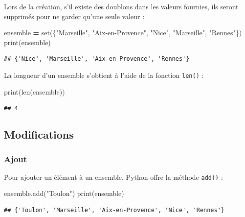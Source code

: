 \documentclass[12pt,]{book}
\newenvironment{Shaded}{\begin{snugshade}}{\end{snugshade}}
\newcommand{\StringTok}[1]{\textcolor[rgb]{0.31,0.60,0.02}{#1}}
\newcommand{\OperatorTok}[1]{\textcolor[rgb]{0.81,0.36,0.00}{\textbf{#1}}}
\newcommand{\BuiltInTok}[1]{#1}
\newcommand{\NormalTok}[1]{#1}
\numberwithin{equation}{section}
\numberwithin{countremarque}{section}
\begin{document}
Lors de la création, s'il existe des doublons dans les valeurs fournies,
ils seront supprimés pour ne garder qu'une seule valeur :

\begin{Shaded}
\begin{Highlighting}[]
\NormalTok{ensemble }\OperatorTok{=} \BuiltInTok{set}\NormalTok{(\{}\StringTok{"Marseille"}\NormalTok{, }\StringTok{"Aix-en-Provence"}\NormalTok{, }\StringTok{"Nice"}\NormalTok{, }\StringTok{"Marseille"}\NormalTok{, }\StringTok{"Rennes"}\NormalTok{\})}
\BuiltInTok{print}\NormalTok{(ensemble)}
\end{Highlighting}
\end{Shaded}

\begin{lstlisting}
## {'Nice', 'Marseille', 'Aix-en-Provence', 'Rennes'}
\end{lstlisting}

La longueur d'un ensemble s'obtient à l'aide de la fonction
\texttt{len()} :

\begin{Shaded}
\begin{Highlighting}[]
\BuiltInTok{print}\NormalTok{(}\BuiltInTok{len}\NormalTok{(ensemble))}
\end{Highlighting}
\end{Shaded}

\begin{lstlisting}
## 4
\end{lstlisting}

\subsection{Modifications}\label{modifications}

\subsubsection{Ajout}\label{ajout}

Pour ajouter un élément à un ensemble, Python offre la méthode
\texttt{add()} :

\begin{Shaded}
\begin{Highlighting}[]
\NormalTok{ensemble.add(}\StringTok{"Toulon"}\NormalTok{)}
\BuiltInTok{print}\NormalTok{(ensemble)}
\end{Highlighting}
\end{Shaded}

\begin{lstlisting}
## {'Toulon', 'Marseille', 'Aix-en-Provence', 'Nice', 'Rennes'}
\end{lstlisting}
\end{document}
